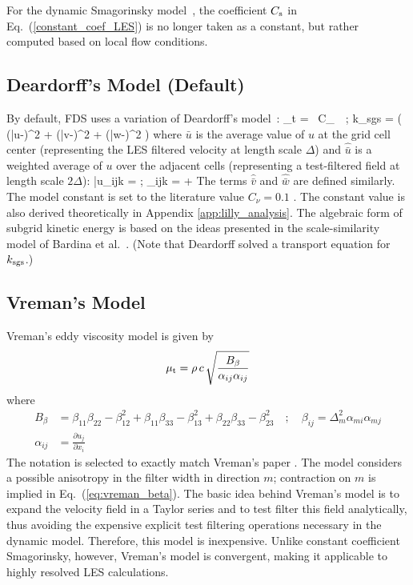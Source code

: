 For the dynamic Smagorinsky model~\cite{Germano:1,Moin:1991}, the coefficient $C_{\rm s}$ in Eq.~(\ref{constant_coef_LES}) is no longer taken as a constant, but rather computed based on local flow conditions.

\subsection{Deardorff's Model (Default)}
\label{sec:deardorff}

By default, FDS uses a variation of Deardorff's model~\cite{Deardorff:1980}:
\be
  \mu_{\rm t} = \rho \, C_\nu \, \Delta \,  \quad ; \quad
  k_{\rm sgs} = \ha \left( (\bar{u}-)^2 + (\bar{v}-)^2 + (\bar{w}-)^2 \right)  \label{Deardorff_LES}
\ee
where $\bar{u}$ is the average value of $u$ at the grid cell center (representing the LES filtered velocity at length scale $\Delta$) and $\hat{\bar{u}}$ is a weighted average of $u$ over the adjacent cells (representing a test-filtered field at length scale $2\Delta$):
\be
   \bar{u}_{ijk} =  \quad ; \quad {}_{ijk} =  + 
\ee
The terms $\hat{\bar{v}}$ and $\hat{\bar{w}}$ are defined similarly.  The model constant is set to the literature value $C_\nu=0.1$ \cite{Pope:2000}.  The constant value is also derived theoretically in Appendix \ref{app:lilly_analysis}.  The algebraic form of subgrid kinetic energy is based on the ideas presented in the scale-similarity model of Bardina et al.~\cite{Bardina:1980}. (Note that Deardorff \cite{Deardorff:1980} solved a transport equation for $k_{\rm sgs}$.)


\subsection{Vreman's Model}
\label{sec:vreman}

Vreman's eddy viscosity model \cite{vreman:2004} is given by
\begin{equation}
\label{eqn_mu_vreman}
\mu_{\rm t} = \rho \, c \, \sqrt{ \frac{B_\beta}{\alpha_{ij}\alpha_{ij}} }
\end{equation}
where
\begin{align}
B_\beta     &= \beta_{11}\beta_{22} - \beta_{12}^2 + \beta_{11}\beta_{33} - \beta_{13}^2 + \beta_{22}\beta_{33} - \beta_{23}^2 \quad ; \quad \beta_{ij} = \Delta_m^2 \alpha_{mi} \alpha_{mj} \label{eq:vreman_beta}\\
\alpha_{ij} &= \frac{\partial u_j}{\partial x_i}
\end{align}
The notation is selected to exactly match Vreman's paper \cite{vreman:2004}.  The model considers a possible anisotropy in the filter width in direction $m$; contraction on $m$ is implied in Eq.~(\ref{eq:vreman_beta}).  The basic idea behind Vreman's model is to expand the velocity field in a Taylor series and to test filter this field analytically, thus avoiding the expensive explicit test filtering operations necessary in the dynamic model.  Therefore, this model is inexpensive.  Unlike constant coefficient Smagorinsky, however, Vreman's model is convergent, making it applicable to highly resolved LES calculations.

